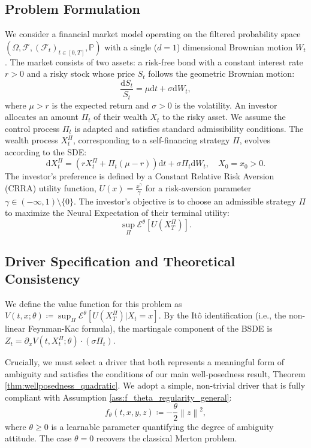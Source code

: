 \documentclass[qian]{imsart}
\newcommand{\Prob}{\mathbb{P}}
\newcommand{\Fcal}{\mathcal{F}}
\newcommand{\cEneutheta}{\mathcal{E}^{\theta}}
\newcommand{\dd}{\mathrm{d}}
\newcommand{\norm}[1]{\left\lVert#1\right\rVert}
\theoremstyle{plain}
\theoremstyle{definition}
\begin{document}
\subsection{Problem Formulation}

We consider a financial market model operating on the filtered probability space $(\Omega, \Fcal, (\Fcal_t)_{t \in [0,T]}, \Prob)$ with a single ($d=1$) dimensional Brownian motion $W_t$. The market consists of two assets: a risk-free bond with a constant interest rate $r > 0$ and a risky stock whose price $S_t$ follows the geometric Brownian motion:
\[ \frac{\dd S_t}{S_t} = \mu \dd t + \sigma \dd W_t, \]
where $\mu > r$ is the expected return and $\sigma > 0$ is the volatility. An investor allocates an amount $\Pi_t$ of their wealth $X_t$ to the risky asset. We assume the control process $\Pi_t$ is adapted and satisfies standard admissibility conditions. The wealth process $X_t^\Pi$, corresponding to a self-financing strategy $\Pi$, evolves according to the SDE:
\begin{equation}
\label{eq:merton_wealth_sde}
\dd X_t^\Pi = \left( r X_t^\Pi + \Pi_t (\mu - r) \right) \dd t + \sigma \Pi_t \dd W_t, \quad X_0 = x_0 > 0.
\end{equation}
The investor's preference is defined by a Constant Relative Risk Aversion (CRRA) utility function, $U(x) = \frac{x^\gamma}{\gamma}$ for a risk-aversion parameter $\gamma \in (-\infty, 1) \setminus \{0\}$. The investor's objective is to choose an admissible strategy $\Pi$ to maximize the Neural Expectation of their terminal utility:
\begin{equation}
\label{eq:merton_objective_neural}
\sup_{\Pi} \cEneutheta \left[ U(X_T^\Pi) \right].
\end{equation}

\subsection{Driver Specification and Theoretical Consistency}

We define the value function for this problem as $V(t,x; \theta) \coloneqq \sup_{\Pi} \cEneutheta[U(X_T^\Pi) | X_t=x]$. By the Itô identification (i.e., the non-linear Feynman-Kac formula), the martingale component of the BSDE is $Z_t = \partial_x V(t,X_t^\Pi; \theta) \cdot (\sigma \Pi_t)$.

Crucially, we must select a driver that both represents a meaningful form of ambiguity and satisfies the conditions of our main well-posedness result, Theorem \ref{thm:wellposedness_quadratic}. We adopt a simple, non-trivial driver that is fully compliant with Assumption \ref{ass:f_theta_regularity_general}:
\begin{equation}
\label{eq:driver_choice_merton}
f_\theta(t,x,y,z) \coloneqq -\frac{\theta}{2} \norm{z}^2,
\end{equation}
where $\theta \ge 0$ is a learnable parameter quantifying the degree of ambiguity attitude. The case $\theta=0$ recovers the classical Merton problem.
\end{document}
